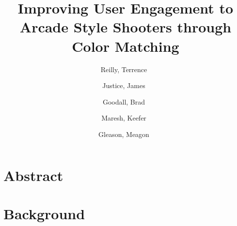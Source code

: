 \documentclass[letterpaper,12pt]{article}
\author{
    Reilly, Terrence\
    \and
    Justice, James\
    \and
    Goodall, Brad\
    \and
    Maresh, Keefer\
    \and
    Gleason, Meagon\
}
\title{Improving User Engagement to Arcade Style Shooters through Color Matching}
\begin{document}
    \linespread{1.5}
    \twocolumn
    \sloppy
    \nocite{*}
    \maketitle

    \section*{Abstract}
    

    \section*{Background}
    

    \onecolumn
    
    
\end{document}
